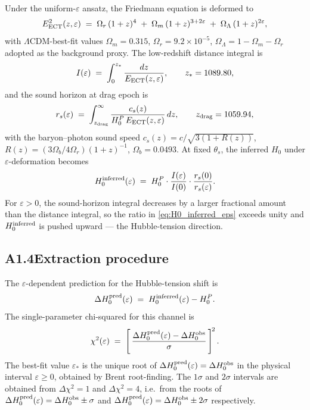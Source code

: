 Under the uniform-$\varepsilon$ ansatz, the Friedmann equation is
deformed to
\begin{equation}
E_{\rm ECT}^2(z,\varepsilon)
\;=\; \Omega_r\,(1+z)^4
\;+\; \Omega_m\,(1+z)^{3+2\varepsilon}
\;+\; \Omega_\Lambda\,(1+z)^{2\varepsilon},
\label{eq:eps_friedmann_A1}
\end{equation}
with $\Lambda$CDM-best-fit values
$\Omega_m = 0.315$, $\Omega_r = 9.2\times 10^{-5}$,
$\Omega_\Lambda = 1 - \Omega_m - \Omega_r$ adopted as the background
proxy. The low-redshift distance integral is
\begin{equation}
I(\varepsilon) \;=\; \int_0^{z_*} \frac{dz}{E_{\rm ECT}(z,\varepsilon)},
\qquad z_* = 1089.80,
\end{equation}
and the sound horizon at drag epoch is
\begin{equation}
r_s(\varepsilon)
\;=\; \int_{z_{\rm drag}}^{\infty}
\frac{c_s(z)}{H_0^P\,E_{\rm ECT}(z,\varepsilon)}\,dz,
\qquad z_{\rm drag} = 1059.94,
\end{equation}
with the baryon--photon sound speed
$c_s(z) = c/\sqrt{3(1+R(z))}$, $R(z) = (3\Omega_b/4\Omega_r)(1+z)^{-1}$,
$\Omega_b = 0.0493$. At fixed $\theta_s$, the inferred $H_0$ under
$\varepsilon$-deformation becomes
\begin{equation}
H_0^{\rm inferred}(\varepsilon)
\;=\; H_0^P \cdot
\frac{I(\varepsilon)}{I(0)}
\cdot
\frac{r_s(0)}{r_s(\varepsilon)}.
\label{eq:H0_inferred_eps}
\end{equation}
For $\varepsilon > 0$, the sound-horizon integral decreases by a
larger fractional amount than the distance integral, so the ratio in
\eqref{eq:H0_inferred_eps} exceeds unity and $H_0^{\rm inferred}$ is
pushed upward --- the Hubble-tension direction.

\subsection*{A1.4\quad Extraction procedure}

The $\varepsilon$-dependent prediction for the Hubble-tension shift is
\begin{equation}
\Delta H_0^{\rm pred}(\varepsilon)
\;=\; H_0^{\rm inferred}(\varepsilon) - H_0^P.
\end{equation}
The single-parameter chi-squared for this channel is
\begin{equation}
\chi^2(\varepsilon)
\;=\;
\left[\,
\frac{\Delta H_0^{\rm pred}(\varepsilon) - \Delta H_0^{\rm obs}}
     {\sigma}
\,\right]^{\!2}.
\label{eq:chi2_hubble_eps}
\end{equation}
The best-fit value $\varepsilon_*$ is the unique root of
$\Delta H_0^{\rm pred}(\varepsilon) = \Delta H_0^{\rm obs}$ in the
physical interval $\varepsilon \geq 0$, obtained by Brent root-finding.
The $1\sigma$ and $2\sigma$ intervals are obtained from
$\Delta\chi^2 = 1$ and $\Delta\chi^2 = 4$, i.e.\ from the roots of
$\Delta H_0^{\rm pred}(\varepsilon) = \Delta H_0^{\rm obs} \pm \sigma$
and
$\Delta H_0^{\rm pred}(\varepsilon) = \Delta H_0^{\rm obs} \pm 2\sigma$
respectively.

